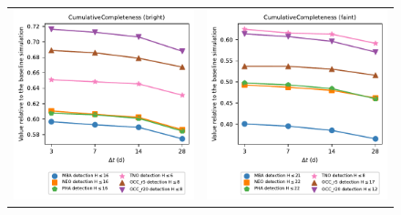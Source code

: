 \documentclass[preprintm,linenumbers]{aastex631}
\begin{document}
		\begin{figure}
			\centering
			\begin{tabular}{@{}c@{}c@{}}
				\includegraphics{results/one_snap_v4_0_n_visits_4_discovery_metric_bright.pdf} &
				\includegraphics{results/one_snap_v4_0_n_visits_4_discovery_metric_faint.pdf} \\
    			

\end{tabular}
\end{figure}
\end{document}
